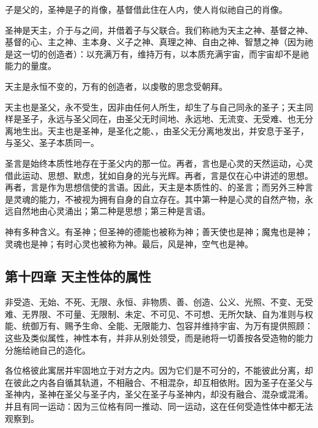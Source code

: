 子是父的，圣神是子的肖像，基督借此住在人内，使人肖似祂自己的肖像。\par

圣神是天主，介于与之间，并借着子与父联合。我们称祂为天主之神、基督之神、基督的心、主之神、主本身、义子之神、真理之神、自由之神、智慧之神（因为祂是这一切的创造者）：以充满万有，维持万有，以本质充满宇宙，而宇宙却不是祂能力的量度。\par

天主是永恒不变的，万有的创造者，以虔敬的思念受朝拜。\par

天主也是圣父，永不受生，因非由任何人所生，却生了与自己同永的圣子；天主同样是圣子，永远与圣父同在，由圣父无时间地、永远地、无流变、无受难、也无分离地生出。天主也是圣神，是圣化之能、，由圣父无分离地发出，并安息于圣子，与圣父、圣子本质同一。\par

圣言是始终本质性地存在于圣父内的那一位。再者，言也是心灵的天然运动，心灵借此运动、思想、默虑，犹如自身的光与光辉。再者，言是仅在心中讲述的思想。再者，言是作为思想信使的言语。因此，天主是本质性的、的圣言；而另外三种言是灵魂的能力，不被视为拥有自身的自立存在。其中第一种是心灵的自然产物，永远自然地由心灵涌出；第二种是思想；第三种是言语。\par

神有多种含义。有圣神；但圣神的德能也被称为神；善天使也是神；魔鬼也是神；灵魂也是神；有时心灵也被称为神。最后，风是神，空气也是神。\par


\subsection{第十四章 天主性体的属性}

非受造、无始、不死、无限、永恒、非物质、善、创造、公义、光照、不变、无受难、无界限、不可量、无限制、未定、不可见、不可想、无所欠缺、自为准则与权能、统御万有、赐予生命、全能、无限能力、包容并维持宇宙、为万有提供照顾：这些及类似属性，神性本有，并非从别处领受，而是祂将一切善按各受造物的能力分施给祂自己的造化。\par

各位格彼此寓居并牢固地立于对方之内。因为它们是不可分的，不能彼此分离，却在彼此之内各自循其轨道，不相融合、不相混杂，却互相依附。因为圣子在圣父与圣神内，圣神在圣父与圣子内，圣父在圣子与圣神内，却没有融合、混杂或混淆。并且有同一运动：因为三位格有同一推动、同一运动，这在任何受造性体中都无法观察到。\par

